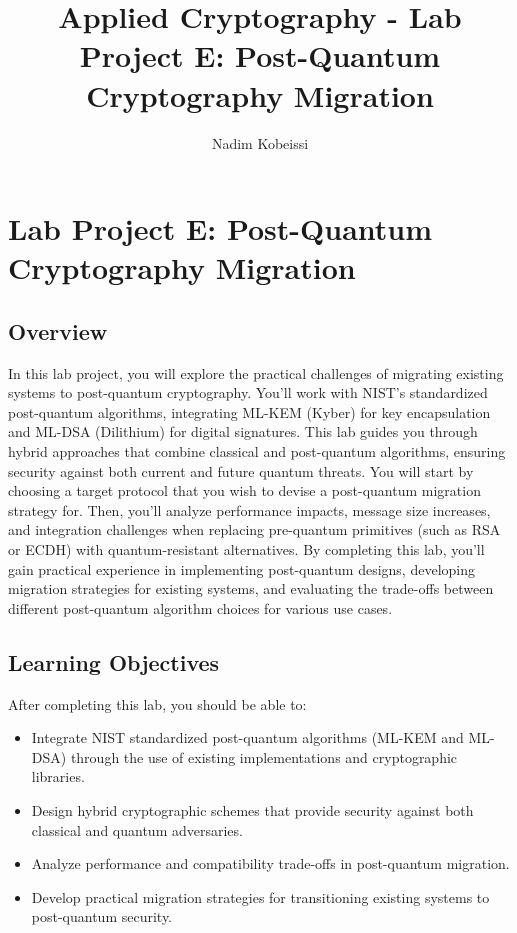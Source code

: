 \documentclass[10pt,a4paper,american]{exam}
\title{Applied Cryptography - Lab Project E: Post-Quantum Cryptography Migration}
\author{Nadim Kobeissi}
\begin{document}
\classhandoutheader
\section*{Lab Project E: Post-Quantum Cryptography Migration}

\subsection*{Overview}
In this lab project, you will explore the practical challenges of migrating existing systems to post-quantum cryptography. You'll work with NIST's standardized post-quantum algorithms, integrating ML-KEM (Kyber) for key encapsulation and ML-DSA (Dilithium) for digital signatures. This lab guides you through hybrid approaches that combine classical and post-quantum algorithms, ensuring security against both current and future quantum threats. You will start by choosing a target protocol that you wish to devise a post-quantum migration strategy for. Then, you'll analyze performance impacts, message size increases, and integration challenges when replacing pre-quantum primitives (such as RSA or ECDH) with quantum-resistant alternatives. By completing this lab, you'll gain practical experience in implementing post-quantum designs, developing migration strategies for existing systems, and evaluating the trade-offs between different post-quantum algorithm choices for various use cases.

\subsection*{Learning Objectives}
After completing this lab, you should be able to:
\begin{itemize}
	\item Integrate NIST standardized post-quantum algorithms (ML-KEM and ML-DSA) through the use of existing implementations and cryptographic libraries.
	\item Design hybrid cryptographic schemes that provide security against both classical and quantum adversaries.
	\item Analyze performance and compatibility trade-offs in post-quantum migration.
	\item Develop practical migration strategies for transitioning existing systems to post-quantum security.
\end{itemize}
\end{document}
